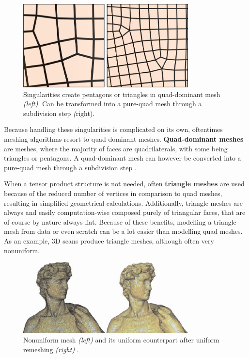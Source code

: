 \documentclass{ACGSeminar}
\begin{document}
\begin{figure}[htb!]
	\begin{centering}
		\includegraphics[width=9cm]{img/Singularities.png}\par
	\end{centering}
	\caption{Singularities create pentagons or triangles in quad-dominant mesh \textit{(left)}. Can be transformed into a pure-quad mesh through a subdivision step \textit(right). \cite{jakob2015instant}}
	\label{fig:singularities}
\end{figure}

Because handling these singularities is complicated on its own, oftentimes meshing algorithms resort to quad-dominant meshes. \textbf{Quad-dominant meshes} are meshes, where the majority of faces are quadrilaterals, with some being triangles or pentagons. A quad-dominant mesh can however be converted into a pure-quad mesh through a subdivision step \cite{jakob2015instant}.\bigskip

When a tensor product structure is not needed, often \textbf{triangle meshes} are used because of the reduced number of vertices in comparison to quad meshes, resulting in simplified geometrical calculations. Additionally, triangle meshes are always and easily computation-wise composed purely of triangular faces, that are of course by nature always flat. Because of these benefits, modelling a triangle mesh from data or even scratch can be a lot easier than modelling quad meshes. As an example, 3D scans produce triangle meshes, although often very nonuniform.\bigskip

\begin{figure}[htb!]
	\begin{centering}
		\includegraphics[width=9cm]{img/Uniform-Mesh.png}\par
	\end{centering}
	\caption{Nonuniform mesh \textit{(left)} and its uniform counterpart after uniform remeshing \textit{(right)} \cite{alliez2008recent}.}
	\label{fig:uniform-mesh}
\end{figure}
\end{document}

